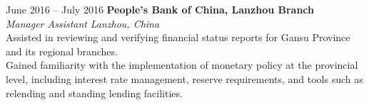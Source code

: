 \documentclass[a4paper,12pt]{article}
\makeatletter
\newenvironment{joblong}[2]
    {
    \begin{tabularx}{\linewidth}{@{}l X r@{}}
    \textbf{#1} & \hfill &  #2 \\[3.75pt]
    \end{tabularx}
    \begin{minipage}[t]{\linewidth}
    \begin{itemize}[nosep,after=\strut, leftmargin=1em, itemsep=3pt,label=--]
    }
    {
    \end{itemize}
    \end{minipage}    
    }
\makeatother
\begin{document}
June 2016 -- July 2016 \hfill \textbf{People’s Bank of China, Lanzhou Branch} \\
\textit{Manager Assistant} \hfill \textit{Lanzhou, China} \\
\textbullet Assisted in reviewing and verifying financial status reports for Gansu Province and its regional branches. \\
\textbullet Gained familiarity with the implementation of monetary policy at the provincial level, including interest rate management, reserve requirements, and tools such as relending and standing lending facilities. 







  
\end{document}

